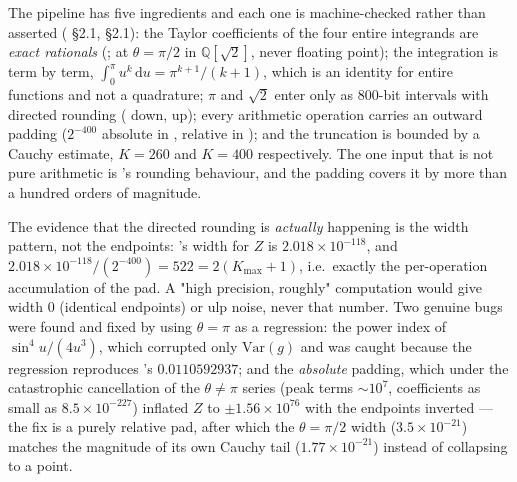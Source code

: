 The pipeline has five ingredients and each one is machine-checked rather than asserted
( \S2.1,  \S2.1): the Taylor coefficients of the four
entire integrands are \emph{exact rationals} (; at $\theta=\pi/2$ in $\mathbb{Q}[\sqrt2]$,
never floating point); the integration is term by term,
$\int_{0}^{\pi}u^{k}\,\mathrm{d} u=\pi^{k+1}/(k+1)$, which is an identity for entire functions and not a
quadrature; $\pi$ and $\sqrt2$ enter only as $800$-bit  intervals with directed rounding
( down,  up); every arithmetic operation carries an outward padding
($2^{-400}$ absolute in , relative in ); and the truncation is bounded by a Cauchy
estimate, $K=260$ and $K=400$ respectively. The one input that is not pure arithmetic is
's rounding behaviour, and the padding covers it by more than a hundred orders of
magnitude.

The evidence that the directed rounding is \emph{actually} happening is the width pattern, not the
endpoints: 's width for $Z$ is $2.018\times10^{-118}$, and
$2.018\times10^{-118}/(2^{-400})=522=2(K_{\max}+1)$, i.e.\ exactly the per-operation accumulation of the
pad. A "high precision, roughly" computation would give width $0$ (identical endpoints) or ulp noise,
never that number. Two genuine bugs were found and fixed by using $\theta=\pi$ as a regression: the
power index of $\sin^{4}u/(4u^{3})$, which corrupted only $\mathrm{Var}(g)$ and was caught because the
regression reproduces 's $0.0110592937$; and the \emph{absolute} padding, which under the
catastrophic cancellation of the $\theta\neq\pi$ series (peak terms $\sim10^{7}$, coefficients as small
as $8.5\times10^{-227}$) inflated $Z$ to $\pm1.56\times10^{76}$ with the endpoints inverted --- the fix
is a purely relative pad, after which the $\theta=\pi/2$ width ($3.5\times10^{-21}$) matches the
magnitude of its own Cauchy tail ($1.77\times10^{-21}$) instead of collapsing to a point. \LT


